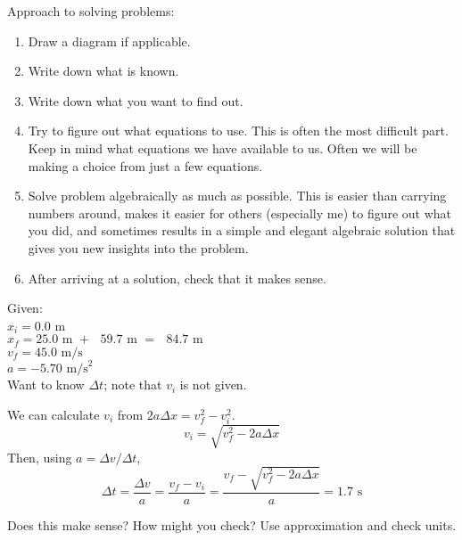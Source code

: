 Approach to solving problems:
\begin{enumerate}
\item Draw a diagram if applicable.
\item Write down what is known.
\item Write down what you want to find out.
\item Try to figure out what equations to use. This is often the most difficult part. Keep in mind what equations we have available to us. Often we will be making a choice from just a few equations. 
\item Solve problem algebraically as much as possible. This is easier than carrying numbers around, makes it easier for others (especially me) to figure out what you did, and sometimes results in a simple and elegant algebraic solution that gives you new insights into the problem.
\item After arriving at a solution, check that it makes sense.
\end{enumerate}

Given:\\
$x_i=0.0$ m\\
$x_f=25.0\mbox{ m }+\mbox{ }59.7\mbox{ m }=\mbox{ }84.7\mbox{ m}$\\
$v_f=45.0\mbox{ m/s}$\\
$a=-5.70\mbox{ m/s}^2$\\

Want to know $\Delta{t}$; note that $v_i$ is not given.

We can calculate $v_i$ from $2a\Delta{x}=v_f^2-v_i^2$.
$$v_i=\sqrt{v_f^2-2a\Delta{x}}$$
Then, using $a=\Delta{v}/\Delta{t}$,
$$\Delta{t}=\frac{\Delta{v}}{a}=\frac{v_f-v_i}{a}=\frac{v_f-\sqrt{v_f^2-2a\Delta{x}}}{a}=1.7\mbox{ s}$$

Does this make sense? How might you check? Use approximation and check units.



\clearpage
